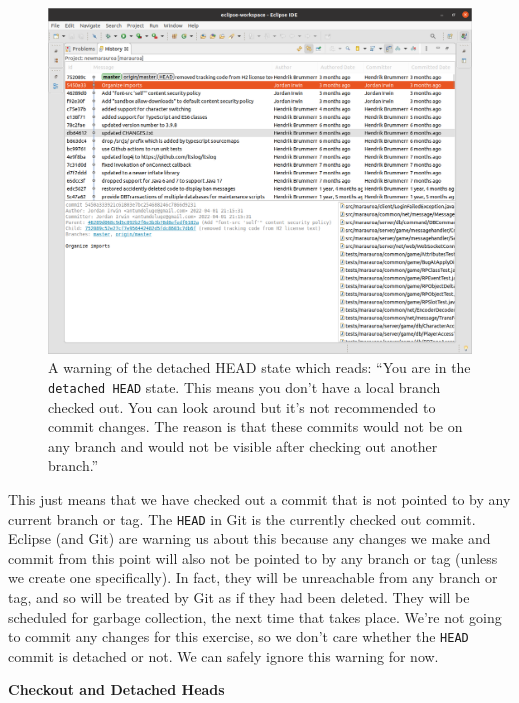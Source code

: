 \documentclass[
]{book}
\begin{document}
\begin{figure}

{\centering \includegraphics[width=1\linewidth]{images/1.4historyTab} 

}

\caption{A warning of the detached HEAD state which reads: ``You are in the \texttt{detached\ HEAD} state. This means you don't have a local branch checked out. You can look around but it's not recommended to commit changes. The reason is that these commits would not be on any branch and would not be visible after checking out another branch.''}\label{fig:detachedHEAD-fig}
\end{figure}



This just means that we have checked out a commit that is not pointed to by any current branch or tag. The \texttt{HEAD} in Git is the currently checked out commit. Eclipse (and Git) are warning us about this because any changes we make and commit from this point will also not be pointed to by any branch or tag (unless we create one specifically). In fact, they will be unreachable from any branch or tag, and so will be treated by Git as if they had been deleted. They will be scheduled for garbage collection, the next time that takes place. We're not going to commit any changes for this exercise, so we don't care whether the \texttt{HEAD} commit is detached or not. We can safely ignore this warning for now.

\textbf{Checkout and Detached Heads}
\end{document}
